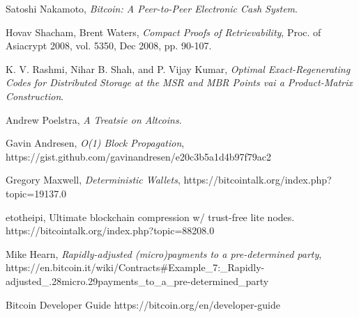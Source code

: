\documentclass[twocolumn]{article}
\begin{document}
\onecolumn
\begin{thebibliography}{9}

	Satoshi Nakamoto,
	\emph{Bitcoin: A Peer-to-Peer Electronic Cash System}.

	Hovav Shacham, Brent Waters,
	\emph{Compact Proofs of Retrievability},
	Proc. of Asiacrypt 2008, vol. 5350, Dec 2008, pp. 90-107.

	K. V. Rashmi, Nihar B. Shah, and P. Vijay Kumar,
	\emph{Optimal Exact-Regenerating Codes for Distributed Storage at the MSR and MBR Points vai a Product-Matrix Construction}.

	Andrew Poelstra,
	\emph{A Treatsie on Altcoins}.

	Gavin Andresen,
	\emph{O(1) Block Propagation},
	https://gist.github.com/gavinandresen/e20c3b5a1d4b97f79ac2

	Gregory Maxwell,
	\emph{Deterministic Wallets},
	https://bitcointalk.org/index.php?topic=19137.0

	etotheipi,
	Ultimate blockchain compression w/ trust-free lite nodes.
	https://bitcointalk.org/index.php?topic=88208.0

	Mike Hearn,
	\emph{Rapidly-adjusted (micro)payments to a pre-determined party},
	https://en.bitcoin.it/wiki/Contracts\#Example\_7:\_Rapidly-adjusted\_.28micro.29payments\_to\_a\_pre-determined\_party

	Bitcoin Developer Guide
	https://bitcoin.org/en/developer-guide


\end{thebibliography}
\end{document}
